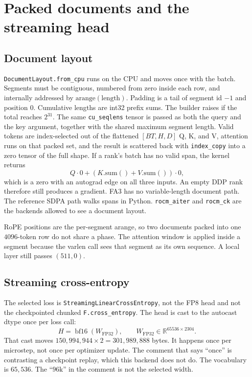 \documentclass[11pt]{article}
\DeclareRobustCommand{\code}[1]{\texttt{#1}}
\newcommand{\bfsixteen}{\operatorname{bf16}}
\begin{document}
\section{Packed documents and the streaming head}

\subsection{Document layout}

\code{DocumentLayout.from\_cpu} runs on the CPU and moves once with the
batch. Segments must be contiguous, numbered from zero inside each row, and
internally addressed by \(\mathrm{arange}(\mathrm{length})\). Padding is a
tail of segment id \(-1\) and position \(0\). Cumulative lengths are int32
prefix sums. The builder raises if the total reaches \(2^{31}\). The same
\code{cu\_seqlens} tensor is passed as both the query and the key argument,
together with the shared maximum segment length. Valid tokens are
index-selected out of the flattened \([BT,H,D]\) Q, K, and V, attention runs
on that packed set, and the result is scattered back with \code{index\_copy}
into a zero tensor of the full shape. If a rank's batch has no valid span,
the kernel returns
\begin{equation}
Q\cdot 0 + (K.\mathrm{sum}()+V.\mathrm{sum}())\cdot 0,
\end{equation}
which is a zero with an autograd edge on all three inputs. An empty DDP rank
therefore still produces a gradient. FA3 has no variable-length document
path. The reference SDPA path walks spans in Python. \code{rocm\_aiter} and
\code{rocm\_ck} are the backends allowed to see a document layout.

RoPE positions are the per-segment arange, so two documents packed into one
\(4096\)-token row do not share a phase. The attention window is applied
inside a segment because the varlen call sees that segment as its own
sequence. A local layer still passes \((511,0)\).

\subsection{Streaming cross-entropy}

The selected loss is \code{StreamingLinearCrossEntropy}, not the FP8 head and
not the checkpointed chunked \code{F.cross\_entropy}. The head is cast to the
autocast dtype once per loss call:
\begin{equation}
H = \bfsixteen(W_{\mathrm{FP32}}),\qquad W_{\mathrm{FP32}}\in\mathbb{R}^{65536\times 2304}.
\end{equation}
That cast moves \(150{,}994{,}944\times 2=301{,}989{,}888\) bytes. It happens
once per microstep, not once per optimizer update. The comment that says
``once'' is contrasting a checkpoint replay, which this backend does not do.
The vocabulary is \(65{,}536\). The ``\(96\mathrm{k}\)'' in the comment is
not the selected width.
\end{document}
